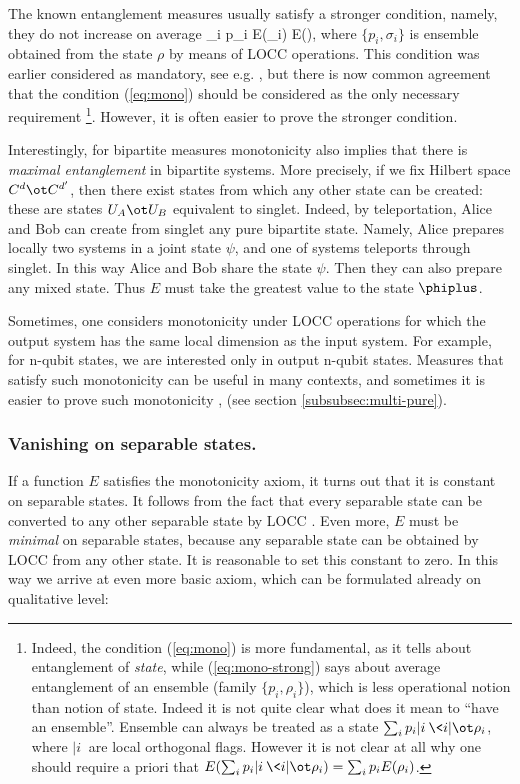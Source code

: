 \documentclass[twocolumn,aps,rmp]{revtex4}
\begin{document}
The known entanglement measures usually satisfy a stronger condition,
namely, they do not increase on average
\be
\sum_i p_i E(\sigma_i) \leq E(\rho),
\label{eq:mono-strong}
\ee
where $\{p_i, \sigma_i\}$  is ensemble obtained from the state $\rho$
by means of LOCC operations. This condition was earlier considered as mandatory,
see e.g. \cite{Michal2001,Plenio2005-logneg}, but there is now common agreement
that the condition (\ref{eq:mono}) should be considered as the only necessary requirement
\footnote{Indeed, the condition (\ref{eq:mono}) is more fundamental, as
it tells about entanglement of {\it state}, while (\ref{eq:mono-strong})
says about average entanglement of an ensemble (family $\{p_i,\rho_i\}$), which is
less operational notion than notion of state.  Indeed it is not quite clear
what does it mean to ``have an ensemble''. Ensemble can always be treated
as a state $\sum_i p_i |i\>\<i|\ot \rho_i$, where $|i\>$ are local orthogonal flags.
However it is not  clear at all  why one should require a priori that
$E(\sum_i p_i |i\>\<i|\ot \rho_i)=\sum_ip_i E(\rho_i)$.}.
However, it is often easier to prove the stronger condition.

Interestingly, for bipartite measures monotonicity also implies
that there is {\it maximal entanglement} in bipartite systems.
More precisely, if we fix Hilbert space $C^d\ot C^{d'}$,
then there exist states from which any other state can be created:
these are states $U_A\ot U_B$ equivalent to singlet. Indeed, by teleportation, Alice
and Bob  can create from singlet any pure bipartite state. Namely, Alice prepares
locally two systems in a joint state $\psi$, and one of systems teleports through singlet.
In this way Alice and Bob share the state $\psi$. Then they can  also prepare
any mixed state. Thus $E$ must take  the greatest value to the state $\phiplus$.

Sometimes, one considers monotonicity under LOCC operations
for which the output system has the same local dimension as the input system.
For example, for n-qubit states, we are interested only in output
n-qubit states. Measures that satisfy such monotonicity
can be useful in many contexts, and sometimes it is easier to
prove such monotonicity \cite{VerstraeteDM2001-normal},
(see section \ref{subsubsec:multi-pure}).




\subsubsection{Vanishing on separable states.}
If a function  $E$ satisfies the monotonicity axiom, it turns out that
it is constant on separable states. It follows from  the fact that
every separable state can be converted to any other separable  state by LOCC
\cite{Vidal-mon2000}.
Even more, $E$ must be {\it minimal} on separable states, because any separable
state can be obtained by LOCC from any other state. It is reasonable to set
this constant to zero. In this way we arrive at even more  basic axiom,
which can be formulated already on qualitative level:
\end{document}
